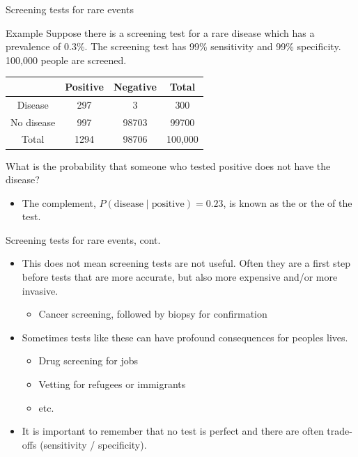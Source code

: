 \documentclass[xcolor=table, aspectratio=169, bigger]{beamer}
\begin{document}
\begin{frame}{Screening tests for rare events}
\begin{exampleblock}{Example}
Suppose there is a screening test for a rare disease which has a prevalence of 0.3\%. The screening test has 99\% sensitivity and 99\% specificity. 100,000 people are screened.\\
\smallskip
{\centering \renewcommand{\arraystretch}{1}
\begin{tabular}{c | c  c | c}
 & Positive & Negative & Total \\
\hline
Disease & 297 & 3 & 300\\
No disease & 997 & 98703 & 99700\\
\hline
Total & 1294 & 98706 & 100,000 
\end{tabular}\par
\renewcommand{\arraystretch}{1.5}
}
\smallskip
What is the probability that someone who tested positive does not have the disease?\\ \smallskip \pause
{}
\begin{itemize}
\pause\item The complement, $P(\text{disease} \mid  \text{positive}) = 0.23$, is known as the  or the  of the test.
\end{itemize}

\end{exampleblock}
\end{frame}

\begin{frame}{Screening tests for rare events, cont.}
\begin{block}{}
\begin{itemize}
\item This does not mean screening tests are not useful. Often they are a first step before tests that are more accurate, but also more expensive and/or more invasive.
\begin{itemize}
\item Cancer screening, followed by biopsy for confirmation
\end{itemize}

\pause
\item Sometimes tests like these can have profound consequences for peoples lives.
\begin{itemize}
\item Drug screening for jobs
\item Vetting for refugees or immigrants 
\item etc.
\end{itemize}

\pause
\item It is important to remember that no test is perfect and there are often trade-offs (sensitivity / specificity).
\end{itemize}
\end{block}
\end{frame}
\end{document}
